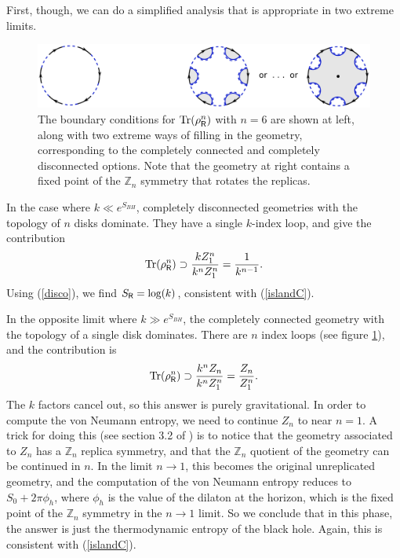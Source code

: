 \documentclass[11pt]{article}
\newcommand{\be}{\begin{equation}}
\newcommand{\ee}{\end{equation}}
\numberwithin{equation}{section}
\def\tr{\text{Tr}}
\begin{document}
First, though, we can do a simplified analysis that is appropriate in two extreme limits.
\begin{figure}[t]
\begin{center}
\includegraphics[scale = .7]{images/1g.pdf}
\caption{{\small The boundary conditions for $\tr(\rho_{\sf{R}}^n)$ with $n = 6$ are shown at left, along with two extreme ways of filling in the geometry, corresponding to the completely connected and completely disconnected options. Note that the geometry at right contains a fixed point of the $\mathbb{Z}_n$ symmetry that rotates the replicas.}}\label{fig1g}
\end{center}
\end{figure}
In the case where $k \ll e^{S_{BH}}$, completely disconnected geometries with the topology of $n$ disks dominate. They have a single $k$-index loop, and give the contribution
\be
\tr(\rho_{\sf{R}}^n) \supset \frac{k Z_1^n}{k^n Z_1^n} = \frac{1}{k^{n-1}}.\label{disco}
\ee
Using (\ref{disco}), we find $S_{\sf{R}}= \log(k)$, consistent with (\ref{islandC}). %

In the opposite limit where $k \gg e^{S_{BH}}$, the completely connected geometry with the topology of a single disk dominates. There are $n$ index loops (see figure \ref{fig1g}), and the contribution is
\be
\tr(\rho_{\sf{R}}^n) \supset \frac{k^n Z_n}{k^n Z_1^n} = \frac{Z_n}{Z_1^n}.
\ee
The $k$ factors cancel out, so this answer is purely gravitational. In order to compute the von Neumann entropy, we need to continue $Z_n$ to near $n = 1$. A trick for doing this (see section 3.2 of \cite{Lewkowycz:2013nqa}) is to notice that the geometry associated to $Z_n$ has a $\mathbb{Z}_n$ replica symmetry, and that the $\mathbb{Z}_n$ quotient of the geometry can be continued in $n$. In the limit $n\rightarrow 1$, this becomes the original unreplicated geometry, and the computation of the von Neumann entropy reduces to $S_0 + 2\pi \phi_h$, where $\phi_h$ is the value of the dilaton at the horizon, which is the fixed point of the $\mathbb{Z}_n$ symmetry in the $n\rightarrow 1$ limit. So we conclude that in this phase, the answer is just the thermodynamic entropy of the black hole. Again, this is consistent with (\ref{islandC}).
\end{document}
